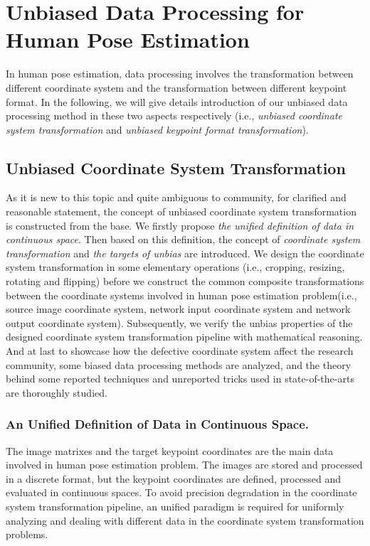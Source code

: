 \documentclass[10pt,journal,compsoc]{IEEEtran}
\begin{document}
\section{Unbiased Data Processing for Human Pose Estimation}
\label{sec:MT}
In human pose estimation, data processing involves the transformation between different coordinate system and the transformation between different keypoint format. In the following, we will give details introduction of our unbiased data processing method in these two aspects respectively (i.e., \textit{unbiased coordinate system transformation} and \textit{unbiased keypoint format transformation}).


\subsection{Unbiased Coordinate System Transformation}
As it is new to this topic and quite ambiguous to community, for clarified and reasonable statement, the concept of unbiased coordinate system transformation is constructed from the base. We firstly propose \textit{the unified definition of data in continuous space}. Then based on this definition, the concept of \textit{coordinate system transformation} and \textit{the targets of unbias} are introduced. We design the coordinate system transformation in some elementary operations (i.e., cropping, resizing, rotating and flipping) before we construct the common composite transformations between the coordinate systems involved in human pose estimation problem(i.e., source image coordinate system, network input coordinate system and network output coordinate system). Subsequently, we verify the unbias properties of the designed coordinate system transformation pipeline with mathematical reasoning. And at last to showcase how the defective coordinate system affect the research community, some biased data processing methods are analyzed, and the theory behind some reported techniques and unreported tricks used in state-of-the-arts are thoroughly studied.

\label{sec:data_process}
\subsubsection{An Unified Definition of Data in Continuous Space.}
The image matrixes and the target keypoint coordinates are the main data involved in human pose estimation problem. The images are stored and processed in a discrete format, but the keypoint coordinates are defined, processed and evaluated in continuous spaces. To avoid precision degradation in the coordinate system transformation pipeline, an unified paradigm is required for uniformly analyzing and dealing with different data in the coordinate system transformation problems.
\end{document}
